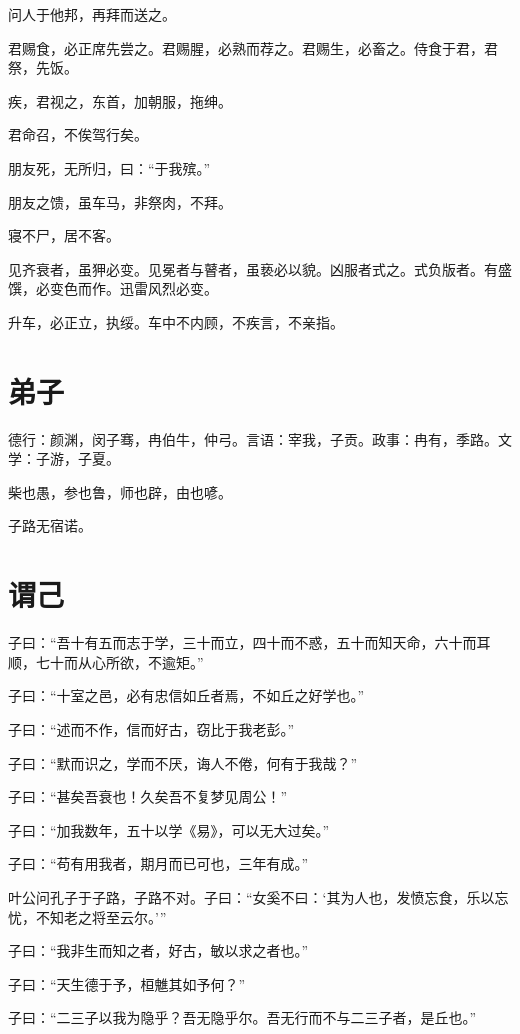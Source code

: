 \documentclass[a5paper]{ctexbook}
\begin{document}
    问人于他邦，再拜而送之。

    君赐食，必正席先尝之。君赐腥，必熟而荐之。君赐生，必畜之。侍食于君，君祭，先饭。

    疾，君视之，东首，加朝服，拖绅。
    
    君命召，不俟驾行矣。

    朋友死，无所归，曰：“于我殡。”
    
    朋友之馈，虽车马，非祭肉，不拜。
    
    寝不尸，居不客。

    见齐衰者，虽狎必变。见冕者与瞽者，虽亵必以貌。凶服者式之。式负版者。有盛馔，必变色而作。迅雷风烈必变。

    升车，必正立，执绥。车中不内顾，不疾言，不亲指。

    \chapter{弟子}

    德行：颜渊，闵子骞，冉伯牛，仲弓。言语：宰我，子贡。政事：冉有，季路。文学：子游，子夏。

    柴也愚，参也鲁，师也辟，由也喭。

    子路无宿诺。

    \chapter{谓己}

    子曰：“吾十有五而志于学，三十而立，四十而不惑，五十而知天命，六十而耳顺，七十而从心所欲，不逾矩。”

    子曰：“十室之邑，必有忠信如丘者焉，不如丘之好学也。”

    子曰：“述而不作，信而好古，窃比于我老彭。”

    子曰：“默而识之，学而不厌，诲人不倦，何有于我哉？”

    子曰：“甚矣吾衰也！久矣吾不复梦见周公！”

    子曰：“加我数年，五十以学《易》，可以无大过矣。”

    子曰：“苟有用我者，期月而已可也，三年有成。”

    叶公问孔子于子路，子路不对。子曰：“女奚不曰：‘其为人也，发愤忘食，乐以忘忧，不知老之将至云尔。’”

    子曰：“我非生而知之者，好古，敏以求之者也。”

    子曰：“天生德于予，桓魋其如予何？”

    子曰：“二三子以我为隐乎？吾无隐乎尔。吾无行而不与二三子者，是丘也。”
\end{document}
